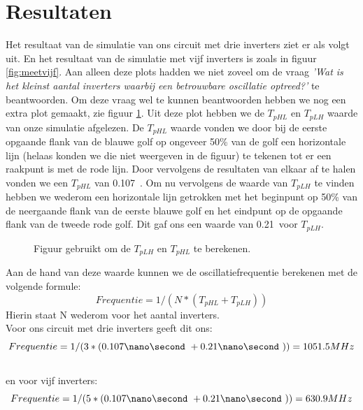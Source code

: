 \documentclass{scrartcl}  %
\begin{document}
\section{Resultaten}
Het resultaat van de simulatie van ons circuit met drie inverters ziet er als volgt uit.
%		
En het resultaat van de simulatie met vijf inverters is zoals in figuur \ref{fig:meetvijf}.
%		
Aan alleen deze plots hadden we niet zoveel om de vraag {\it 'Wat is het kleinst aantal inverters waarbij een betrouwbare oscillatie optreed?'} te beantwoorden. Om deze vraag wel te kunnen beantwoorden hebben we nog een extra plot gemaakt, zie figuur \ref{fig:tplhtphl5}. Uit deze plot hebben we de $T_{pHL}$ en $T_{pLH}$ waarde van onze simulatie afgelezen. De $T_{pHL}$ waarde vonden we door bij de eerste opgaande flank van de blauwe golf op ongeveer 50\% van de golf een horizontale lijn (helaas konden we die niet weergeven in de figuur) te tekenen tot er een raakpunt is met de rode lijn. Door vervolgens de resultaten van elkaar af te halen vonden we een $T_{pHL}$ van 0.107\nano\second\ . Om nu vervolgens de waarde van $T_{pLH}$ te vinden hebben we wederom een horizontale lijn getrokken met het beginpunt op 50\% van de neergaande flank van de eerste blauwe golf en het eindpunt op de opgaande flank van de tweede rode golf. Dit gaf ons een waarde van 0.21\nano\second\ voor $T_{pLH}$.

\begin{figure}[H]
\centering
		\setlength{} 
		\setlength{}
		
		\caption{Figuur gebruikt om de $T_{pLH}$ en $T_{pHL}$ te berekenen.}
		\label{fig:tplhtphl5}
\end{figure}
Aan de hand van deze waarde kunnen we de oscillatiefrequentie berekenen met de volgende formule: 
\begin{equation}
Frequentie = 1/(N*(T_{pHL}+T_{pLH}))
\end{equation}
Hierin staat N wederom voor het aantal inverters. 
\\Voor ons circuit met drie inverters geeft dit ons: 
\begin{equation}
Frequentie = 1/(3*(0.107\nano\second\ + 0.21\nano\second\ )) = 1051.5 MHz
\end{equation} 
\\en voor vijf inverters:
\begin{equation}
Frequentie = 1/(5*(0.107\nano\second\ + 0.21\nano\second\ )) = 630.9 MHz
\end{equation} 
\end{document}
